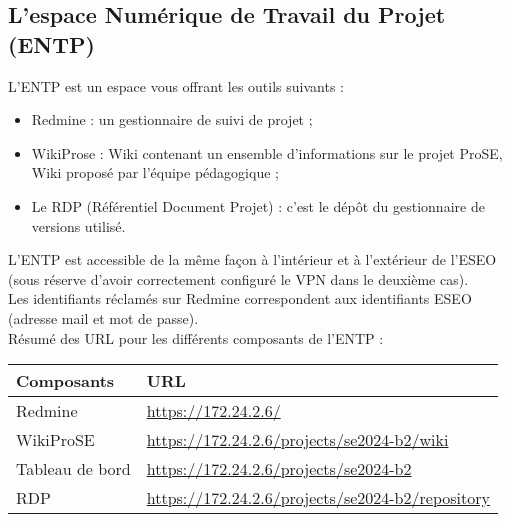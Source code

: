 \documentclass[a4paper,11pt,titlepage]{article}
\begin{document}
\subsection{L'espace Numérique de Travail du Projet (ENTP)}
L'ENTP est un espace vous offrant les outils suivants :
\begin{itemize}
    \item Redmine : un gestionnaire de suivi de projet ;
    \item WikiProse : Wiki contenant un ensemble d'informations sur le projet ProSE, Wiki proposé par l'équipe pédagogique ;
    \item Le RDP (Référentiel Document Projet) : c'est le dépôt du gestionnaire de versions utilisé.
\end{itemize}
L'ENTP est accessible de la même façon à l'intérieur et à l'extérieur de l'ESEO (sous réserve d'avoir correctement configuré le VPN dans le deuxième cas).\\
Les identifiants réclamés sur Redmine correspondent aux identifiants ESEO
(adresse mail et mot de passe).\\
Résumé des URL pour les différents composants de l'ENTP :

\begin{table}[H]
    \begin{tabular}{|l|l|}
        \hline
        \rowcolor[HTML]{CCCCCC}
        Composants      & URL                                                                                                       \\ \hline
        Redmine         & \href{https://172.24.2.6/}{https://172.24.2.6/}                                                           \\ \hline
        WikiProSE       & \href{https://172.24.2.6/projects/se2024-b2/wiki}{https://172.24.2.6/projects/se2024-b2/wiki}             \\ \hline
        Tableau de bord & \href{https://172.24.2.6/projects/se2024-b2}{https://172.24.2.6/projects/se2024-b2}                       \\ \hline
        RDP             & \href{https://172.24.2.6/projects/se2024-b2/repository}{https://172.24.2.6/projects/se2024-b2/repository} \\ \hline
    \end{tabular}
\end{table}
\end{document}
